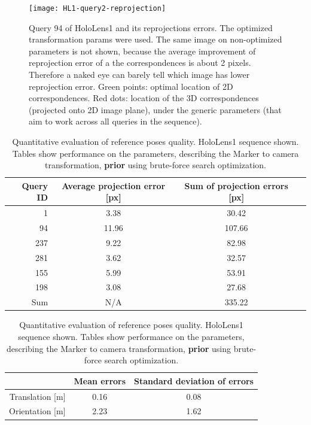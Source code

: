 \documentclass[twoside]{ctuthesis}
\theoremstyle{plain}
\theoremstyle{definition}
\theoremstyle{note}
\newcommand{\HLvsRefPosesErrorsCaption}{Estimate of reference vs ground truth poses errors. All the queries in the sequence were considered, with two kinds of exceptions. Queries, for which we do not have a reference pose (Vicon got lost) are not considered in the statistics. Queries for which we do not have a corresponding pose from HoloLens (due to the delay) are also not included in the statistics. Ground truth poses are estimated from the poses provided from HoloLens, after conversion to World coordinate system.}
\begin{document}
\begin{figure}
	\centering
 	\texttt{[image: HL1-query2-reprojection]}
 	\caption[Reprojection error on optimized s10e parameters]{Query 94 of HoloLens1 and its reprojections errors. The optimized transformation params were used. The same image on non-optimized parameters is not shown, because the average improvement of reprojection error of a the correspondences is about 2 pixels. Therefore a naked eye can barely tell which image has lower reprojection error. Green points: optimal location of 2D correspondences. Red dots: location of the 3D correspondences (projected onto 2D image plane), under the generic parameters (that aim to work across all queries in the sequence).}
 	\label{fig:interesting-reprojection-s10e-query-2}
\end{figure} 

\begin{table}
	\begin{subtable}{.9\linewidth}\centering
		{
		\footnotesize
		\begin{tabular}{|r|c|c|c|}
			\hline
			Query ID & Average projection error [px] & Sum of projection errors [px] \\
			\hline
			1 & 3.38 & 30.42 \\
			94 & 11.96 & 107.66 \\
			237 & 9.22 & 82.98 \\
			281 & 3.62 & 32.57 \\
			155 & 5.99 & 53.91 \\
			198 & 3.08 & 27.68 \\
			\hline
			\hline
			Sum & N/A & 335.22 \\
			\hline
		\end{tabular}
		}
		\caption{Reprojection error.}
		\label{tab:interesting-reprojection-non-optimized-s10e}
	\quad
	\end{subtable}
	\begin{subtable}{.9\linewidth}\centering
		{
		\footnotesize
		\begin{tabular}{|r||c|c|}
			\hline
			& Mean errors & Standard deviation of errors \\
			\hline
			Translation [m] & 0.16 & 0.08 \\
			Orientation [m] & 2.23 & 1.62 \\
			\hline
		\end{tabular}
		}
		\caption{\HLvsRefPosesErrorsCaption{}}
		\label{tab:HL1-ref-non-optimized-vs-HL-errors}
	\end{subtable}
	\caption[Evaluation of non-optimized HoloLens1 reference poses]{Quantitative evaluation of reference poses quality. HoloLens1 sequence shown. Tables show performance on the parameters, describing the Marker to camera transformation, \textbf{prior} using brute-force search optimization.}
	\label{tab:HL1-ref-non-optimized-poses-errors}
\end{table}
\end{document}
